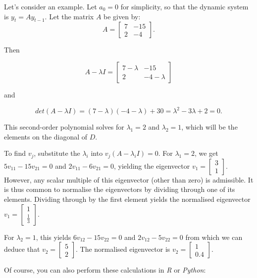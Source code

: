 \documentclass[
  letterpaper,
  DIV=11,
  numbers=noendperiod]{scrreprt}
\begin{document}
Let's consider an example. Let \(a_0=0\) for simplicity, so that the
dynamic system is \(y_t = Ay_{t-1}\). Let the matrix \(A\) be given by:
\[A=\begin{bmatrix}7 & -15 \\ 2 & -4 \end{bmatrix}.\]

Then

\[A-\lambda I =\begin{bmatrix}7 - \lambda & -15 \\ 2 & -4 - \lambda \end{bmatrix}\]

and

\[det(A-\lambda I)=(7-\lambda)(-4-\lambda)+30=\lambda^2 - 3\lambda +2=0.\]

This second-order polynomial solves for \(\lambda_1=2\) and
\(\lambda_2=1\), which will be the elements on the diagonal of \(D\).

To find \(v_j\), substitute the \(\lambda_i\) into
\(v_j(A-\lambda_iI)=0\). For \(\lambda_1=2\), we get
\(5v_{11}- 15v_{21}=0\) and \(2v_{11}- 6v_{21}=0\), yielding the
eigenvector \(v_1=\begin{bmatrix} 3 \\ 1\end{bmatrix}\). However, any
scalar multiple of this eigenvector (other than zero) is admissible. It
is thus common to normalise the eigenvectors by dividing through one of
its elements. Dividing through by the first element yields the
normalised eigenvector
\(v_1=\begin{bmatrix} 1 \\ \frac{1}{3} \end{bmatrix}\).

For \(\lambda_2=1\), this yields \(6v_{12}- 15v_{22}=0\) and
\(2v_{12}-5v_{22}=0\) from which we can deduce that
\(v_2=\begin{bmatrix} 5 \\ 2\end{bmatrix}\). The normalised eigenvector
is \(v_2=\begin{bmatrix} 1 \\ 0.4 \end{bmatrix}\).

Of course, you can also perform these calculations in \emph{R} or
\emph{Python}:
\end{document}
